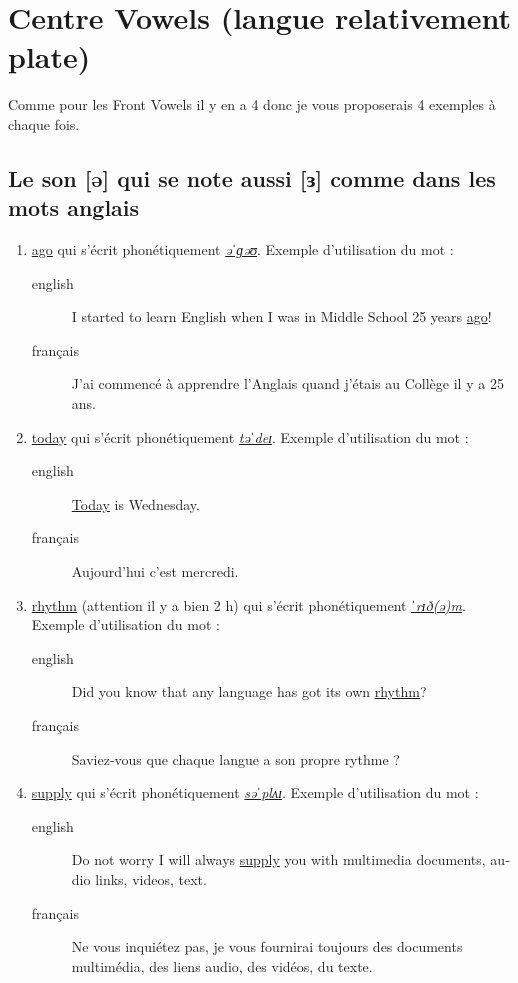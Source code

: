 \documentclass[12pt,a4paper]{book}
\begin{document}
\section{Centre Vowels (langue relativement plate)}
\label{sec:org05de138}
Comme pour les Front Vowels il y en a 4 donc je vous proposerais 4
exemples à chaque fois.
\subsection{Le son [ə] qui se note aussi [ɜ] comme dans les mots anglais}
\label{sec:org909cc21}
\begin{enumerate}
\item \href{http://www.wordreference.com/enfr/ago}{ago} qui s'écrit phonétiquement \href{https://en.oxforddictionaries.com/definition/ago}{\emph{əˈɡəʊ}}. Exemple d'utilisation du mot :
\begin{description}
\item[{english}] \textenglish{I started to learn English when I was in Middle School
25 years \href{https://youtu.be/RO4fWbM3WA8}{ago}!}
\item[{français}] J'ai commencé à apprendre l'Anglais quand j'étais au
Collège il y a 25 ans.
\end{description}
\item \href{http://www.wordreference.com/enfr/today}{today} qui s'écrit phonétiquement \href{https://en.oxforddictionaries.com/definition/today}{\emph{təˈdeɪ}}. Exemple d'utilisation du mot :
\begin{description}
\item[{english}] \textenglish{\href{https://youtu.be/yCSLK0WCUd8}{Today} is Wednesday.}
\item[{français}] Aujourd'hui c'est mercredi.
\end{description}
\item \href{http://www.wordreference.com/enfr/rhythm}{rhythm} (attention il y a bien 2 h) qui s'écrit phonétiquement
\href{https://en.oxforddictionaries.com/definition/rhythm}{\emph{ˈrɪð(ə)m}}. Exemple d'utilisation du mot :
\begin{description}
\item[{english}] \textenglish{Did you know that any language has got its own \href{https://youtu.be/XQJVoS3SlX0}{rhythm}?}
\item[{français}] Saviez-vous que chaque langue a son propre rythme ?
\end{description}
\item \href{http://www.wordreference.com/enfr/supply}{supply} qui s'écrit phonétiquement \href{https://en.oxforddictionaries.com/definition/supply}{\emph{səˈplʌɪ}}. Exemple d'utilisation du mot : 
\begin{description}
\item[{english}] \textenglish{Do not worry I will always \href{https://youtu.be/qEd6QUbK2Mw}{supply} you with multimedia
documents, audio links, videos, text.}
\item[{français}] Ne vous inquiétez pas, je vous fournirai toujours des
documents multimédia, des liens audio, des vidéos, du texte.
\end{description}
\end{enumerate}
\end{document}
